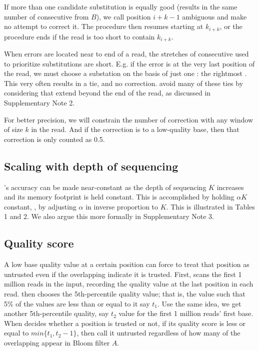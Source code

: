 \documentclass{bmcart}
\begin{document}
If more than one candidate substitution is equally good (\thatis results in the same number of consecutive \kmers from $B$), we call position $i+k-1$ ambiguous and make no attempt to correct it.
The procedure then resumes starting at $k_{i+k}$, or the procedure ends if the read is too short to contain \kmer $k_{i+k}$.

When errors are located near to end of a read, the stretches of consecutive \kmers used to prioritize substitutions are short.  E.g. if the error is at the very last position of the read, we must choose a substation on the basis of just one \kmer: the rightmost \kmer.  This very often results in a tie, and no correction.  \tool avoid many of these ties by considering \kmers that extend beyond the end of the read, as discussed in Supplementary Note 2.

For better precision, we will constrain the number of correction with any window of size $k$ in the read. And if the correction is to a low-quality base, then that correction is only counted as 0.5.

\subsection*{Scaling with depth of sequencing}
\tool's accuracy can be made near-constant as the depth of sequencing $K$ increases and its memory footprint is held constant.  This is accomplished by holding $\alpha K$ constant, \thatis, by adjusting $\alpha$ in inverse proportion to $K$.  This is illustrated in Tables 1 and 2.  We also argue this more formally in Supplementary Note 3.

\subsection*{Quality score}
A low base quality value at a certain position can force \tool to treat that position as untrusted even if the overlapping \kmers indicate it is trusted.  First, \tool scans the first 1 million reads in the input, recording the quality value at the last position in each read.  \tool then chooses the 5th-percentile quality value; that is, the value such that 5\% of the values are less than or equal to it say $t_1$. Use the same idea, we get another 5th-percentile quality, say $t_2$ value for the first 1 million reads' first base. When \tool decides whether a position is trusted or not, if its quality score is less or equal to $min\{t_1, t_2 - 1\}$, then call it untrusted regardless of how many of the overlapping \kmers appear in Bloom filter $A$. 
\end{document}
